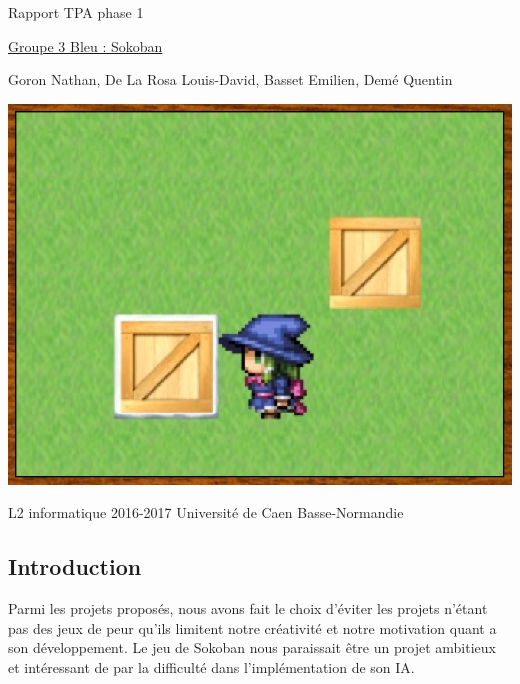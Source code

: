 \documentclass{article}
\begin{document}
\begin{titlepage}
\begin{center}
\Huge Rapport TPA phase 1

\normalsize
\vspace{0.5cm}
\Large {\underline{ Groupe 3 Bleu : Sokoban} }

\vspace{1cm}

\normalsize
Goron Nathan, De La Rosa Louis-David, Basset Emilien, Demé Quentin

\vspace{1cm}
\begin{center}
\includegraphics[scale=0.7]{../Screenshots/main.jpg}
\end{center}
\vspace{3.5cm}
L2 informatique 2016-2017 Université de Caen Basse-Normandie
\end{center}
\end{titlepage}


\newpage
\tableofcontents

\newpage
\begin{center}
	\section{Introduction}
\end{center}
\vspace{1cm}
	Parmi les projets proposés, nous avons fait le choix d'éviter les projets n'étant pas des jeux de peur qu'ils limitent notre créativité et notre motivation quant a son développement. Le jeu de Sokoban nous paraissait être un projet ambitieux et intéressant de par la difficulté dans l'implémentation de son IA.
 \vspace{0.5cm}
\end{document}
